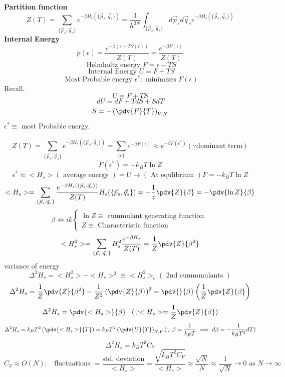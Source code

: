 \textbf{Partition function} 
\[
    Z(T) = \sum\limits_{\{\vec{p}_s,\vec{q}_s\}} e^{-\beta H_s(\{\vec{p}_s,\vec{q}_s\})} = \frac{1}{h^{3N} }\int_{\{\vec{p}_s,\vec{q}_s\}} d\vec{p}_s d\vec{q}_s  e^{-\beta H_s(\{\vec{p}_s,\vec{q}_s\})}
\]
\textbf{Internal}  \textbf{Energy} 
\[
    p(\epsilon ) = \frac{e^{- \beta (\epsilon -TS(\epsilon))}}{Z(T)} = \frac{e^{-\beta F(\epsilon )}}{Z(T)}
\]
\[
    \text{ Helmholtz energy } F = \epsilon - T S
\]
\[
    \text{ Internal Energy } U = F + TS
\]
\[
    \text{ Most Probable energy } \epsilon^* : \text{ minimizes } F(\epsilon )
\]
Recall,
\[
    U = F + T S
\]
\[
    dU = dF + TdS + SdT
\]
\[
    S = - \left( \pdv{F}{T}\right)_{V,N}
\]
\(\epsilon ^* \equiv \) most Probable energy. 

\[
    Z(T) = \sum\limits_{\{\vec{p}_s,\vec{q}_s\}} e^{-\beta H_s(\{\vec{p}_s,\vec{q}_s\})} = \sum\limits_{\{\epsilon\}}e^{-\beta F(\epsilon )} \approx e^{- \beta F(\epsilon^*)} (\because \text{dominant term})
\]
\[
    F(\epsilon^*) = - k_B T \ln  Z
\]
\[
    \epsilon^* \approx <H_s> (\text{ average energy }) = U \to(\text{ At equlibrium  }) F = -k_B T \ln Z 
\]
\[
    <H_s> = \sum\limits_{\{\vec{p}_s,\vec{q}_s\}} \frac{e^{-\beta H_s(\{\vec{p}_s,\vec{q}_s\})}}{Z(T)} H_s(\{\vec{p}_s,\vec{q}_s\}) = -\frac{1}{z}\pdv{Z}{\beta} = -\pdv{\ln Z}{\beta}
\]
\[
    \beta \iff ik \begin{cases}
        \ln Z \equiv \text{ cummulant generating function }\\
        Z \equiv \text{ Characteristic function }
    \end{cases}
\]
\[
    <H_s ^2> = \sum\limits_{\{\vec{p}_s,\vec{q}_s\}}H_s ^2  \frac{e^{-\beta H_s}}{Z(T)} = \frac{1}{Z}\pdv{Z}{\beta^2}
\]
variance of energy 
\[
    \Delta^2 H_s = <H_s ^2> - <H_s>^2 \equiv <H_s ^2>_c (\text{ 2nd cummmulants })
\]
\[
    \Delta^2 H_s = \frac{1}{Z}\pdv{Z}{\beta^2} - \frac{1}{Z^2}\left(\pdv{Z}{\beta}\right)^2 = \pdv{}{\beta}\left(\frac{1}{Z}\pdv{Z}{\beta}\right)
\]
\[
    \Delta^2 H_s  = \pdv{<H_s>}{\beta} \;\;\; (\because <H_s> = \frac{1}{Z}\pdv{Z}{\beta} )
\]
\[
    \Delta^2 H_s = k_B T^2 \left(\pdv{<H_s>}{T}\right) = k_B T^2 \left(\pdv{U}{T}\right)_{N,V} (\because \beta = \frac{1}{k_B T} \implies d\beta = -\frac{1}{k_B T^2}dT)
\]
\[
    \Delta^2 H_s = k_B T^2 C_V
\]
\[
    C_V \approx O(N);\;\; \text{ fluctuations } = \frac{\text{std. deviation}}{<H_s>} =\frac{\sqrt{k_B T^2 C_V} }{<H_s>} \approx \frac{\sqrt{N} }{N} \approx\frac{1}{\sqrt{N} } \to 0 \text{ as } N\to \infty 
\]
